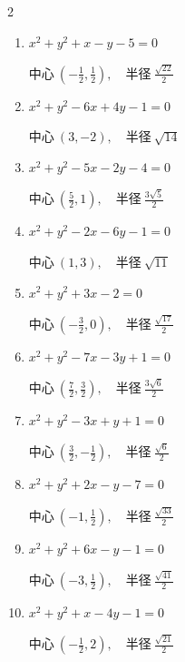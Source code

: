 \begin{multicols}{2}
\begin{enumerate}
        $\displaystyle 中心\: \left(\frac{7}{2},-3\right), \quad 半径 \ \frac{\sqrt{73}}{2}$

  \item $x^{2}+y^{2}+x-y-5=0$

        $\displaystyle 中心\: \left(-\frac{1}{2},\frac{1}{2}\right), \quad 半径 \ \frac{\sqrt{22}}{2}$

  \item $x^{2}+y^{2}-6x+4y-1=0$

        $\displaystyle 中心\: \left(3,-2\right), \quad 半径 \ \sqrt{14}$

  \item $x^{2}+y^{2}-5x-2y-4=0$

        $\displaystyle 中心\: \left(\frac{5}{2},1\right), \quad 半径 \ \frac{3\sqrt{5}}{2}$

  \item $x^{2}+y^{2}-2x-6y-1=0$

        $\displaystyle 中心\: \left(1,3\right), \quad 半径 \ \sqrt{11}$

  \item $x^{2}+y^{2}+3x-2=0$

        $\displaystyle 中心\: \left(-\frac{3}{2},0\right), \quad 半径 \ \frac{\sqrt{17}}{2}$

  \item $x^{2}+y^{2}-7x-3y+1=0$

        $\displaystyle 中心\: \left(\frac{7}{2},\frac{3}{2}\right), \quad 半径 \ \frac{3\sqrt{6}}{2}$

  \item $x^{2}+y^{2}-3x+y+1=0$

        $\displaystyle 中心\: \left(\frac{3}{2},-\frac{1}{2}\right), \quad 半径 \ \frac{\sqrt{6}}{2}$

  \item $x^{2}+y^{2}+2x-y-7=0$

        $\displaystyle 中心\: \left(-1,\frac{1}{2}\right), \quad 半径 \ \frac{\sqrt{33}}{2}$

  \item $x^{2}+y^{2}+6x-y-1=0$

        $\displaystyle 中心\: \left(-3,\frac{1}{2}\right), \quad 半径 \ \frac{\sqrt{41}}{2}$

  \item $x^{2}+y^{2}+x-4y-1=0$

        $\displaystyle 中心\: \left(-\frac{1}{2},2\right), \quad 半径 \ \frac{\sqrt{21}}{2}$

\columnbreak %


\end{enumerate}
\end{multicols}
